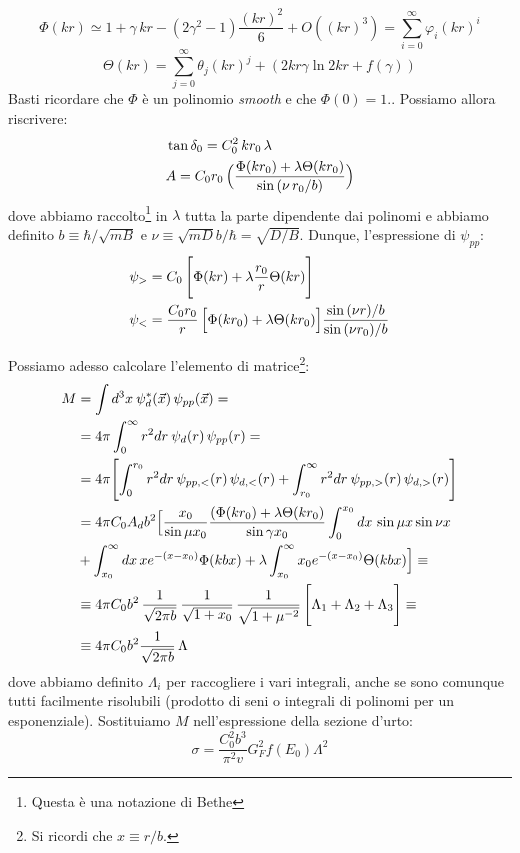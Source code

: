 \begin{itemize}
{    $$\Phi(kr)\simeq 1+\gamma\, kr - (2\gamma^2-1)\frac{(kr)^2}{6} + O((kr)^3) = \sum_{i=0}^\infty \varphi_i (kr)^i$$
    $$\Theta(kr) = \sum_{j=0}^\infty \theta_j (kr)^j + (2kr\gamma\ln{2kr}+f(\gamma))$$
    Basti ricordare che $\Phi$ è un polinomio \textit{smooth} e che $\Phi(0)=1$.}. Possiamo allora riscrivere:
    \begin{displaymath}
    \begin{aligned}
        &\tan{\delta_0} = C_0^2 \, kr_0 \, \lambda \\
        &A = C_0r_0\, \Bigl ( \frac{\Phi(kr_0)+\lambda\Theta(kr_0)}{\sin{(\nu \, r_0/b)}} \Bigr )            
    \end{aligned}
    \end{displaymath}
    dove abbiamo raccolto\footnote{Questa è una notazione di Bethe} in $\lambda$ tutta la parte dipendente dai polinomi e abbiamo definito $b\equiv \hbar/\sqrt{mB}$ e $\nu\equiv \sqrt{mD} b/\hbar = \sqrt{D/B}$. Dunque, l'espressione di $\psi_{pp}$:
    \begin{displaymath}
        \begin{aligned}
            \psi_> &= C_0\, \Biggl [ \Phi(kr) + \lambda \frac{r_0}{r}\Theta(kr) \Biggr ]\\ 
            \psi_< &= \frac{C_0r_0}{r} \, \Bigl [ \Phi(kr_0)+\lambda\Theta(kr_0) \Bigr ]\frac{\sin{(\nu r)/b}}{\sin{(\nu r_0)/b}}
        \end{aligned}
    \end{displaymath}
\end{itemize}
Possiamo adesso calcolare l'elemento di matrice\footnote{Si ricordi che $x\equiv r/b$.}:
\begin{displaymath}
    \begin{aligned}
        M&=\int d^3x \: \psi^*_d(\vec{x}) \, \psi_{pp} (\vec{x}) = \\ 
        &= 4\pi \int_0^\infty r^2 dr \: \psi_d(r)\,\psi_{pp} (r)  = \\ 
        &=  4\pi \Biggl [  \int_0^{r_0} r^2 dr \: \psi_{pp,<} (r)\, \psi_{d,<}(r) + \int_{r_0}^\infty r^2 dr \: \psi_{pp,>} (r)\, \psi_{d,>}(r)  \Biggr ] \\ 
        &= 4\pi C_0 A_d b^2 \Bigl [ \frac{x_0}{\sin{\mu x_0}} \frac{(\Phi(kr_0)+\lambda\Theta(kr_0)}{\sin{\gamma x_0}} \int_0^{x_0} dx\, \sin{\mu x} \sin{\nu x} \\ 
        &+ \int_{x_0}^\infty dx\, xe^{-(x-x_0)}\Phi(kbx) + \lambda \int_{x_0}^\infty x_0 e^{-(x-x_0)}\Theta(kbx) \Bigr ] \equiv \\ 
        &\equiv 4\pi C_0 b^2 \, \frac{1}{\sqrt{2\pi b}}\, \frac{1}{\sqrt{1+x_0}}\,\frac{1}{\sqrt{1+\mu^{-2}}} \, \Biggl [ \Lambda_1+\Lambda_2+\Lambda_3 \Biggr ] \equiv \\ 
        &\equiv 4\pi C_0b^2 \frac{1}{\sqrt{2\pi b}} \, \Lambda
    \end{aligned}
\end{displaymath}
dove abbiamo definito $\Lambda_i$ per raccogliere i vari integrali, anche se sono comunque tutti facilmente risolubili (prodotto di seni o integrali di polinomi per un esponenziale). Sostituiamo $M$ nell'espressione della sezione d'urto:
$$ \sigma = \frac{C_0^2 b^3}{\pi^2 v} G_F^2 f(E_0) \Lambda^2 $$

